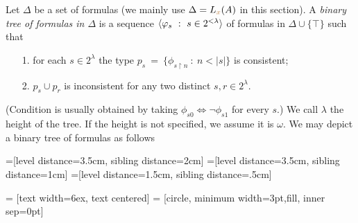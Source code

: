 \documentclass[creche.tex]{subfiles}
\begin{document}
\begin{definition}\label{def_tree_formulas}
Let $\Delta$ be a set of formulas (we mainly use $\Delta=L_{\color{brown} x}(A)$ in this section).
A \emph{binary tree of formulas in $\Delta$\/} is a sequence $\<\phi_s\ :\ s\in2^{<\lambda}\>$ of formulas in $\Delta\cup\{\top\}$ such that\nobreak
\begin{itemize}
\item[1.] for each $s\in 2^\lambda$ the type $p_s\ =\ \big\{\phi_{s\restriction n}\ :\ n<|s|\big\}$ is consistent;
\item[2.] $p_s\cup p_r$ is inconsistent for any two distinct $s,r\in 2^\lambda$.
\end{itemize}
(Condition  is usually obtained by taking $\phi_{s0}\iff\neg\phi_{s1}$ for every $s$.) We call $\lambda$ the height of the tree.
If the height is not specified, we assume it is $\omega$.
We may depict a binary tree of formulas as follows


=[level distance=3.5cm, sibling distance=2cm]
=[level distance=3.5cm, sibling distance=1cm]
=[level distance=1.5cm, sibling distance=.5cm]

 = [text width=6ex, text centered]
 = [circle, minimum width=3pt,fill, inner sep=0pt]

\def\leaf{.
.
.}


\end{definition}
\end{document}
